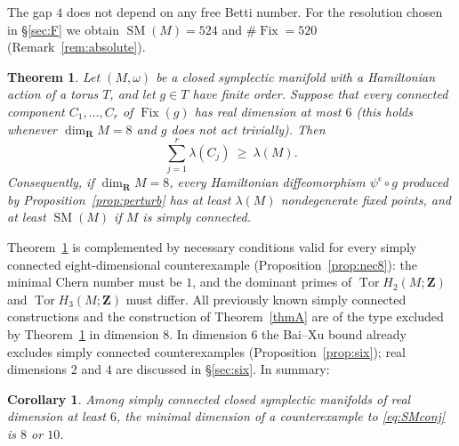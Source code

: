 \documentclass[11pt]{amsart}
\numberwithin{equation}{section}
\newtheorem{corollary}[theorem]{Corollary}
\newtheorem{mainthm}{Theorem}
\theoremstyle{definition}
\theoremstyle{remark}
\newcommand{\Z}{\mathbf Z}
\newcommand{\R}{\mathbf R}
\DeclareMathOperator{\Tor}{Tor}
\DeclareMathOperator{\SM}{SM}
\DeclareMathOperator{\Fix}{Fix}
\begin{document}
The gap $4$ does not depend on any free Betti number. For the resolution
chosen in \S\ref{sec:F} we obtain $\SM(M)=524$ and $\#\Fix=520$
(Remark~\ref{rem:absolute}).

\begin{mainthm}\label{thmB}
Let $(M,\omega)$ be a closed symplectic manifold with a Hamiltonian action
of a torus $T$, and let $g\in T$ have finite order. Suppose that every
connected component $C_1,\dots,C_r$ of $\Fix(g)$ has real dimension at
most $6$ (this holds whenever $\dim_\R M=8$ and $g$ does not act
trivially). Then
\[
  \sum_{j=1}^r\lambda(C_j)\ \ge\ \lambda(M).
\]
Consequently, if $\dim_\R M=8$, every Hamiltonian diffeomorphism
$\psi^\epsilon\circ g$ produced by Proposition~\ref{prop:perturb} has at
least $\lambda(M)$ nondegenerate fixed points, and at least $\SM(M)$ if
$M$ is simply connected.
\end{mainthm}

Theorem~\ref{thmB} is complemented by necessary conditions valid for every
simply connected eight-dimensional counterexample
(Proposition~\ref{prop:nec8}): the minimal Chern number must be $1$, and
the dominant primes of $\Tor H_2(M;\Z)$ and $\Tor H_3(M;\Z)$ must differ.
All previously known simply connected constructions
\cite{OpenAIStable,OpenAI22,OpenAICompanion} and the construction of
Theorem~\ref{thmA} are of the type excluded by Theorem~\ref{thmB} in
dimension $8$. In dimension $6$ the Bai--Xu bound already excludes
simply connected counterexamples (Proposition~\ref{prop:six}); real
dimensions $2$ and $4$ are discussed in \S\ref{sec:six}. In summary:

\begin{corollary}\label{cor:mindim}
Among simply connected closed symplectic manifolds of real dimension at
least $6$, the minimal dimension of a counterexample to
\eqref{eq:SMconj} is $8$ or $10$.
\end{corollary}
\end{document}
